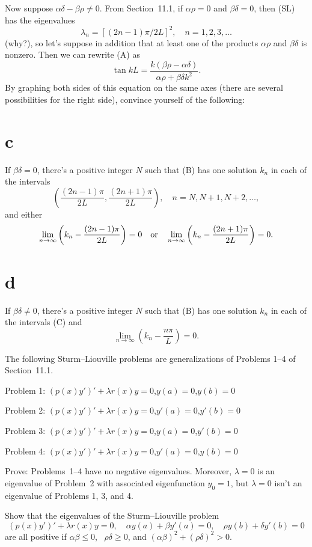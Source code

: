 \begin{exerciselist}
  Now suppose $\alpha\delta-\beta\rho\ne0$. From Section~11.1, if $\alpha\rho=0$ and
  $\beta\delta=0$, then (SL) has the eigenvalues
  \[
    \lambda_{n}=[(2n-1)\pi/2L]^{2},\quad n=1,2,3,\dots
  \]
  (why?), so let's suppose in addition that at least one of the products $\alpha\rho$ and
  $\beta\delta$ is nonzero. Then we can rewrite (A) as
  \begin{equation}
    \tag{B}\tan kL= \frac{k(\beta\rho-\alpha\delta)}{\alpha\rho+\beta\delta k^{2}}.
  \end{equation}
  By graphing both sides of this equation on the same axes (there are several possibilities for the
  right side), convince yourself of the following:

  \part{c} If $\beta\delta=0$, there's a positive integer $N$ such that (B) has one solution $k_{n}$
  in each of the intervals
  \begin{equation}
    \tag{C}\left(\frac{(2n-1)\pi}{2L},\frac{(2n+1)\pi}{2L}\right),\quad n=N,N+1,N+2,\dots,
  \end{equation}
  and either
  \[
    \lim_{n\to\infty}\left(k_{n}-\frac{(2n-1)\pi}{2L}\right)=0 \text{\quad or\quad}\lim_{n\to\infty}\left(k_{n}-\frac{(2n+1)\pi}{2L}\right)=0.
  \]

  \part{d} If $\beta\delta\ne0$, there's a positive integer $N$ such that (B) has one solution
  $k_{n}$ in each of the intervals (C) and
  \[
    \lim_{n\to\infty}\left(k_{n}-\frac{n\pi}{L}\right)=0.
  \]

  \item\label{exer:13.2.31} The following Sturm--Liouville problems are generalizations of Problems
        1--4 of Section~11.1.

  \quad Problem 1: \quad $(p(x)y')'+\lambda r(x)y=0$,\quad $y(a)=0$,\quad $y(b)=0$

  \quad Problem 2: \quad $(p(x)y')'+\lambda r(x)y=0$,\quad $y'(a)=0$,\quad $y'(b)=0$

  \quad Problem 3: \quad $(p(x)y')'+\lambda r(x)y=0$,\quad $y(a)=0$,\quad $y'(b)=0$

  \quad Problem 4: \quad $(p(x)y')'+\lambda r(x)y=0$,\quad $y'(a)=0$,\quad $y(b)=0$

  Prove: Problems~1--4 have no negative eigenvalues. Moreover, $\lambda=0$ is an eigenvalue of
  Problem~2 with associated eigenfunction $y_{0}=1$, but $\lambda=0$ isn't an eigenvalue of Problems
  1, 3, and 4. 

  \item\label{exer:13.2.32} Show that the eigenvalues of the Sturm--Liouville problem
  \[
    (p(x)y')'+\lambda r(x)y=0,\quad\alpha y(a)+\beta y'(a)=0,\quad \rho y(b)+\delta y'(b)=0 \]
  are all positive if $\alpha\beta\le0$, \, $\rho\delta\ge0$, and
  $(\alpha\beta)^{2}+(\rho\delta)^{2}>0$.
\end{exerciselist}
